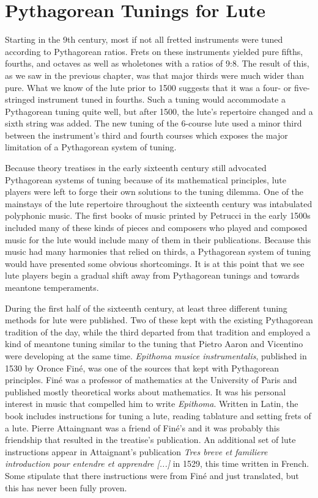 \section{Pythagorean Tunings for Lute}

Starting in the 9th century, most if not all fretted instruments were tuned according to
Pythagorean ratios.  Frets on these instruments yielded pure fifths, fourths, and octaves
as well as wholetones with a ratios of 9:8. \autocite[9]{ML:1} The result of this, as we
saw in the previous chapter, was that major thirds were much wider than pure.  What we
know of the lute prior to 1500 suggests that it was a four- or five-stringed instrument
tuned in fourths.  Such a tuning would accommodate a Pythagorean tuning quite well, but
after 1500, the lute's repertoire changed and a sixth string was added.  The new tuning of
the 6-course lute used a minor third between the instrument's third and fourth courses
which exposes the major limitation of a Pythagorean system of tuning.

Because theory treatises in the early sixteenth century still advocated Pythagorean
systems of tuning because of its mathematical principles, lute players were left to
forge their own solutions to the tuning dilemma.  One of the mainstays of the lute
repertoire throughout the sixteenth century was intabulated polyphonic music. The first
books of music printed by Petrucci in the early 1500s included many of these kinds of
pieces and composers who played and composed music for the lute would include many of
them in their publications. Because this music had many harmonies that relied on
thirds, a Pythagorean system of tuning would have presented some obvious shortcomings.
It is at this point that we see lute players begin a gradual shift away from
Pythagorean tunings and towards meantone temperaments.

During the first half of the sixteenth century, at least three different tuning methods
for lute were published.  Two of these kept with the existing Pythagorean tradition of
the day, while the third departed from that tradition and employed a kind of meantone
tuning similar to the tuning that Pietro Aaron and Vicentino were developing at the
same time. \textit{Epithoma musice instrumentalis}, published in 1530 by Oronce
Fin\'{e}, was one of the sources that kept with Pythagorean principles.  Fin\'{e} was a
professor of mathematics at the University of Paris and published mostly theoretical
works about mathematics. It was his personal interest in music that compelled him to
write \textit{Epithoma}. Written in Latin, the book includes instructions for tuning a
lute, reading tablature and setting frets of a lute.  Pierre Attaingnant was a friend
of Fin\'{e}'s and it was probably this friendship that resulted in the treatise's
publication.  An additional set of lute instructions appear in Attaignant's publication
\textit{Tres breve et familiere introduction pour entendre et apprendre [...]} in 1529,
this time written in French.  Some stipulate that there instructions were from Fin\'{e}
and just translated, but this has never been fully proven.\autocite[1]{PV:1}

